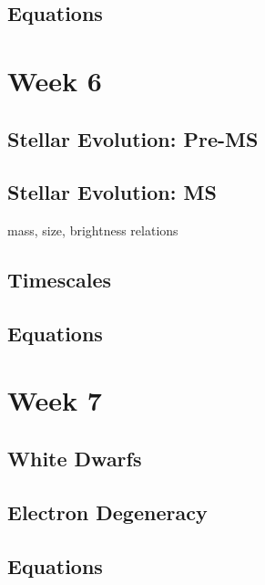 \documentclass[a4paper,10pt]{article}
\begin{document}
\subsection{Equations}



\newpage
\section{Week 6}

\subsection{Stellar Evolution: Pre-MS}

\subsection{Stellar Evolution: MS}
mass, size, brightness relations

\subsection{Timescales}

\subsection{Equations}

 

\newpage
\section{Week 7}

\subsection{White Dwarfs}

\subsection{Electron Degeneracy}

\subsection{Equations}
\end{document}
